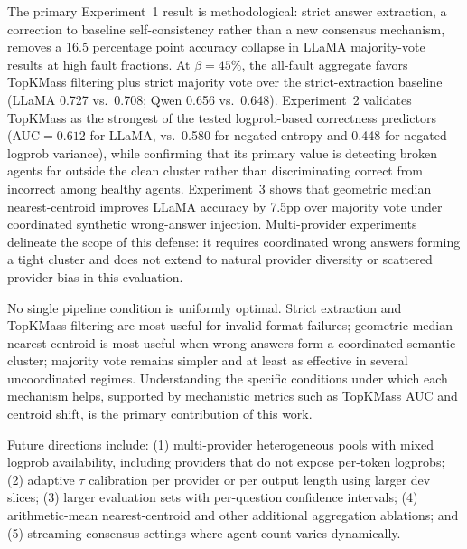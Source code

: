 \documentclass[11pt]{article}
\begin{document}
The primary Experiment~1 result is methodological: strict answer extraction, a
correction to baseline self-consistency rather than a new consensus mechanism,
removes a 16.5 percentage point accuracy collapse in LLaMA majority-vote
results at high fault fractions. At $\beta=45\%$, the all-fault aggregate
favors TopKMass filtering plus strict majority vote over the strict-extraction
baseline (LLaMA 0.727 vs.\ 0.708; Qwen 0.656 vs.\ 0.648). Experiment~2 validates TopKMass as the strongest of the tested
logprob-based correctness predictors (AUC$=0.612$ for LLaMA, vs.\ 0.580 for
negated entropy and 0.448 for negated logprob variance), while confirming that
its primary value is detecting broken agents far outside the clean cluster rather
than discriminating correct from incorrect among healthy agents. Experiment~3
shows that geometric median nearest-centroid improves LLaMA accuracy by 7.5pp
over majority vote under coordinated synthetic wrong-answer injection.
Multi-provider experiments delineate the scope of this defense: it requires
coordinated wrong answers forming a tight cluster and does not extend to natural
provider diversity or scattered provider bias in this evaluation.

No single pipeline condition is uniformly optimal. Strict extraction and TopKMass
filtering are most useful for invalid-format failures; geometric median
nearest-centroid is most useful when wrong answers form a coordinated semantic
cluster; majority vote remains simpler and at least as effective in several
uncoordinated regimes. Understanding the specific conditions under which each
mechanism helps, supported by mechanistic metrics such as TopKMass AUC and
centroid shift, is the primary contribution of this work.

Future directions include: (1) multi-provider heterogeneous pools with mixed
logprob availability, including providers that do not expose per-token logprobs;
(2) adaptive $\tau$ calibration per provider or per output length using larger
dev slices; (3) larger evaluation sets with per-question confidence intervals;
(4) arithmetic-mean nearest-centroid and other additional aggregation ablations;
and (5) streaming consensus settings where agent count varies dynamically.

\FloatBarrier


\clearpage

\appendix
\end{document}
